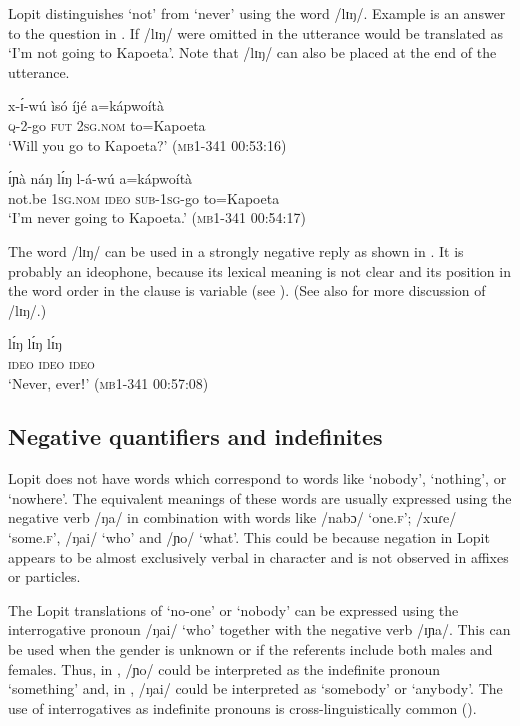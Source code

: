 \documentclass[output=paper,colorlinks,citecolor=brown,draftmode]{langscibook}
\begin{document}
Lopit distinguishes ‘not’ from ‘never’ using the word /lɪŋ/.  Example  is an answer to the question in . If /lɪŋ/ were omitted in  the utterance would be translated as ‘I’m not going to Kapoeta’. Note that /lɪŋ/ can also be placed at the end of the utterance.

\ea\label{ex:lop:78}
        \gll x-ɪ́-wú ìsó  íjé a=kápwoítà   \\ 
             \textsc{q}{}-2-go \textsc{fut} 2\textsc{sg.nom} to=Kapoeta \\
        \glt ‘Will you go to Kapoeta?’ (\textsc{mb1-341} 00:53:16)
\z

\ea\label{ex:lop:79}
        \gll ɪ́ɲà náŋ  lɪ́ŋ l-á-wú a=kápwoítà  \\ 
             not.be \textsc{1sg.nom} \textsc{ideo} \textsc{sub-1sg-}go to=Kapoeta \\
        \glt ‘I’m never going to Kapoeta.’  (\textsc{mb1-341} 00:54:17)
\z

The word /lɪŋ/ can be used in a strongly negative reply as shown in . It is probably an ideophone, because its lexical meaning is not clear and its position in the word order in the clause is variable (see \citealt[347]{MoodieBillington2020}). (See also  for more discussion of /lɪŋ/.)

\ea\label{ex:lop:80}
        \gll lɪ́ŋ lɪ́ŋ lɪ́ŋ \\ 
             \textsc{ideo} \textsc{ideo} \textsc{ideo}  \\
        \glt ‘Never, everǃ’ (\textsc{mb1-341} \textsc{00}:57:08)
\z

\subsection{Negative quantifiers and indefinites}
\label{sec:lop:3.2}
Lopit does not have words which correspond to words like ‘nobody’, ‘nothing’, or ‘nowhere’. The equivalent meanings of these words are usually expressed using the negative verb /ŋa/ in combination with words like /nabɔ/ ‘one.\textsc{f}’; /xuɾe/ ‘some.\textsc{f}’, /ŋai/ ‘who’ and /ɲo/ ‘what’. This could be because negation in Lopit appears to be almost exclusively verbal in character and is not observed in affixes or particles.

The Lopit translations of ‘no-one’ or ‘nobody’ can be expressed using the interrogative pronoun /ŋai/ ‘who’ together with the negative verb /ɪɲa/.  This can be used when the gender is unknown or if the referents include both males and females. Thus, in , /ɲo/ could be interpreted as the indefinite pronoun ‘something’ and, in , /ŋai/ could be interpreted as ‘somebody’ or ‘anybody’. The use of interrogatives as indefinite pronouns is cross-linguistically common (\citealt[170--176]{Haspelmath1997}). 
\end{document}

